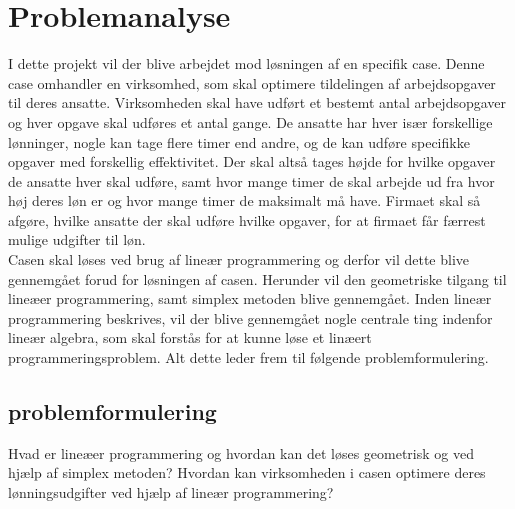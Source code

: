 \section{Problemanalyse}

I dette projekt vil der blive arbejdet mod løsningen af en specifik case. 
Denne case omhandler en virksomhed, som skal optimere tildelingen af arbejdsopgaver til deres ansatte.
Virksomheden skal have udført et bestemt antal arbejdsopgaver og hver opgave skal udføres et antal gange. 
De ansatte har hver især forskellige lønninger, nogle kan tage flere timer end andre, og de kan udføre specifikke opgaver med forskellig effektivitet.
Der skal altså tages højde for hvilke opgaver de ansatte hver skal udføre, samt hvor mange timer de skal arbejde ud fra hvor høj deres løn er og hvor mange timer de maksimalt må have.
Firmaet skal så afgøre, hvilke ansatte der skal udføre hvilke opgaver, for at firmaet får færrest mulige udgifter til løn. \\
Casen skal løses ved brug af lineær programmering og derfor vil dette blive gennemgået forud for løsningen af casen. 
Herunder vil den geometriske tilgang til lineæer programmering, samt simplex metoden blive gennemgået. 
Inden lineær programmering beskrives, vil der blive gennemgået nogle centrale ting indenfor lineær algebra, som skal forstås for at kunne løse et linæert programmeringsproblem.
Alt dette leder frem til følgende problemformulering.

\subsection{problemformulering}
Hvad er lineæer programmering og hvordan kan det løses geometrisk og ved hjælp af simplex metoden? Hvordan kan virksomheden i casen optimere deres lønningsudgifter ved hjælp af lineær programmering?
